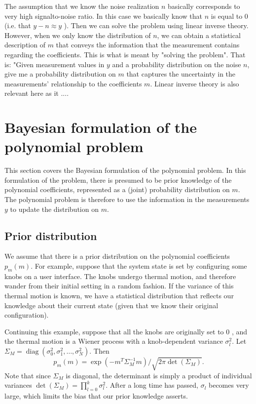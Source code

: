 \documentclass[11pt]{article}
\begin{document}
The assumption that we know the noise realization $n$ basically corresponds to very high signalto-noise ratio. In this case we basically know that $n$ is equal to 0 (i.e. that $y-n \approx y$ ). Then we can solve the problem using linear inverse theory. However, when we only know the distribution of $n$, we can obtain a statistical description of $m$ that conveys the information that the measurement contains regarding the coefficients. This is what is meant by "solving the problem". That is: "Given measurement values in $y$ and a probability distribution on the noise $n$, give me a probability distribution on $m$ that captures the uncertainty in the measurements' relationship to the coefficients $m$. Linear inverse theory is also relevant here as it ....

\section{Bayesian formulation of the polynomial problem}

This section covers the Bayesian formulation of the polynomial problem. In this formulation of the problem, there is presumed to be prior knowledge of the polynomial coefficients, represented as a (joint) probability distribution on $m$. The polynomial problem is therefore to use the information in the measurements $y$ to update the distribution on $m$.

\subsection{Prior distribution}

We assume that there is a prior distribution on the polynomial coefficients $p_{m}(m)$. For example, suppose that the system state is set by configuring some knobs on a user interface. The knobs undergo thermal motion, and therefore wander from their initial setting in a random fashion. If the variance of this thermal motion is known, we have a statistical distribution that reflects our knowledge about their current state (given that we know their original configuration).

Continuing this example, suppose that all the knobs are originally set to 0 , and the thermal motion is a Wiener process with a knob-dependent variance $\sigma_{l}^{2}$. Let $\Sigma_{M}=\operatorname{diag}\left(\sigma_{0}^{2}, \sigma_{1}^{2}, \ldots, \sigma_{N}^{2}\right)$. Then
\begin{equation}
p_{m}(m)=\exp \left(-m^{T} \Sigma_{M}^{-1} m\right) / \sqrt{2 \pi \operatorname{det}\left(\Sigma_{M}\right)} .
\end{equation}
Note that since $\Sigma_{M}$ is diagonal, the determinant is simply a product of individual variances $\operatorname{det}\left(\Sigma_{M}\right)=\prod_{l=0}^{k} \sigma_{l}^{2}$. After a long time has passed, $\sigma_{l}$ becomes very large, which limits the bias that our prior knowledge asserts.
\end{document}
